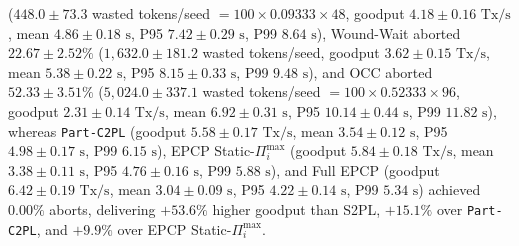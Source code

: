 \documentclass[conference,10pt]{IEEEtran}
\begin{document}
\begin{enumerate}
($448.0 \pm 73.3$ wasted tokens/seed $= 100\times 0.09333\times 48$, goodput $4.18 \pm 0.16\text{ Tx/s}$, mean $4.86 \pm 0.18\text{ s}$, P95 $7.42 \pm 0.29\text{ s}$, P99 $8.64\text{ s}$), Wound-Wait aborted $22.67 \pm 2.52\%$ ($1{,}632.0 \pm 181.2$ wasted tokens/seed, goodput $3.62 \pm 0.15\text{ Tx/s}$, mean $5.38 \pm 0.22\text{ s}$, P95 $8.15 \pm 0.33\text{ s}$, P99 $9.48\text{ s}$), and OCC aborted $52.33 \pm 3.51\%$ ($5{,}024.0 \pm 337.1$ wasted tokens/seed $= 100\times 0.52333\times 96$, goodput $2.31 \pm 0.14\text{ Tx/s}$, mean $6.92 \pm 0.31\text{ s}$, P95 $10.14 \pm 0.44\text{ s}$, P99 $11.82\text{ s}$), whereas \texttt{Part-C2PL} (goodput $5.58 \pm 0.17\text{ Tx/s}$, mean $3.54 \pm 0.12\text{ s}$, P95 $4.98 \pm 0.17\text{ s}$, P99 $6.15\text{ s}$), EPCP Static-$\Pi_i^{\max}$ (goodput $5.84 \pm 0.18\text{ Tx/s}$, mean $3.38 \pm 0.11\text{ s}$, P95 $4.76 \pm 0.16\text{ s}$, P99 $5.88\text{ s}$), and Full EPCP (goodput $6.42 \pm 0.19\text{ Tx/s}$, mean $3.04 \pm 0.09\text{ s}$, P95 $4.22 \pm 0.14\text{ s}$, P99 $5.34\text{ s}$) achieved $0.00\%$ aborts, delivering $+53.6\%$ higher goodput than S2PL, $+15.1\%$ over \texttt{Part-C2PL}, and $+9.9\%$ over EPCP Static-$\Pi_i^{\max}$.

\end{enumerate}
\end{document}
